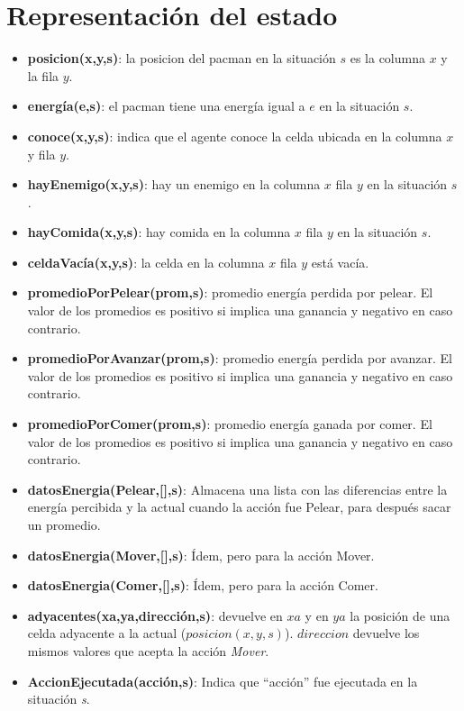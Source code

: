 \section{Representación del estado}

\begin{itemize}

\item \textbf{posicion(x,y,s)}: la posicion del pacman en la situación $s$ es
la columna $x$ y la fila $y$.

\item \textbf{energía(e,s)}: el pacman tiene una energía igual a $e$ en la
situación $s$.

\item \textbf{conoce(x,y,s)}: indica que el agente conoce la celda ubicada
en la columna $x$ y fila $y$.

\item \textbf{hayEnemigo(x,y,s)}: hay un enemigo en la columna $x$ fila $y$ en
la situación $s$.

\item \textbf{hayComida(x,y,s)}: hay comida en la columna $x$ fila $y$ en la
situación $s$.

\item \textbf{celdaVacía(x,y,s)}: la celda en la columna $x$ fila $y$ está
vacía.

\item \textbf{promedioPorPelear(prom,s)}: promedio energía perdida por pelear.
El valor de los promedios es positivo si implica una ganancia y negativo en
caso contrario.

\item \textbf{promedioPorAvanzar(prom,s)}: promedio energía perdida por
avanzar. El valor de los promedios es positivo si implica una ganancia y
negativo en caso contrario.

\item \textbf{promedioPorComer(prom,s)}: promedio energía ganada por comer. El
valor de los promedios es positivo si implica una ganancia y negativo en caso
contrario.

\item \textbf{datosEnergia(Pelear,[],s)}: Almacena una lista con las diferencias
entre la energía percibida y la actual cuando la acción fue Pelear, para después
sacar un promedio.

\item \textbf{datosEnergia(Mover,[],s)}: Ídem, pero para la acción Mover.

\item \textbf{datosEnergia(Comer,[],s)}: Ídem, pero para la acción Comer.

\item \textbf{adyacentes(xa,ya,dirección,s)}: devuelve en $xa$ y en $ya$ la
posición de una celda adyacente a la actual ($posicion(x,y,s)$). $direccion$
devuelve los mismos valores que acepta la acción \emph{Mover}.

\item \textbf{AccionEjecutada(acción,s)}: Indica que ``acción'' fue ejecutada
en la situación \emph{s}.

\end{itemize}
